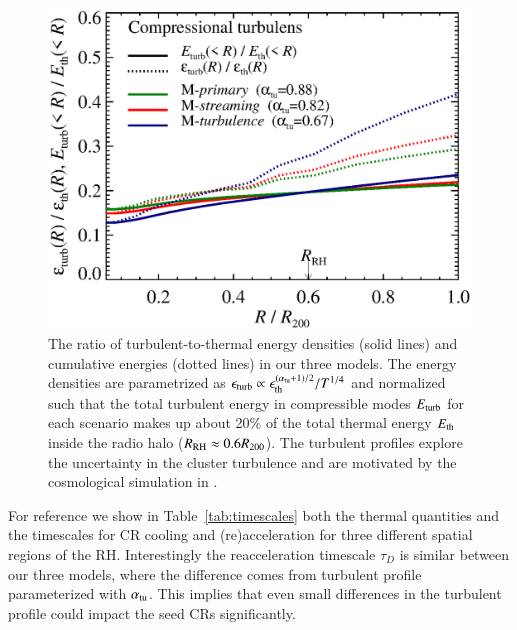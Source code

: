 \documentclass[a4paper,fleqn,usenatbib]{mnras}
\begin{document}
\begin{figure}
  \includegraphics[width=1.0\columnwidth]{turb_profile_ratio_tot.eps}
  \caption{The ratio of turbulent-to-thermal energy densities (solid
    lines) and cumulative energies (dotted lines) in our three
    models. The energy densities are parametrized as
    $\epsilon_{\mathrm{turb}} \propto
    \epsilon_{\mathrm{th}}^{(\alpha_{{\mathrm{tu}}}+1)/2}/T^{1/4}$ and
    normalized such that the total turbulent energy in compressible
    modes $E_{\mathrm{turb}}$ for each scenario makes up about 20\% of the
    total thermal energy $E_{\mathrm{th}}$ inside the radio halo
    ($R_{\mathrm{RH}}\approx0.6R_{200}$). The turbulent profiles explore
    the uncertainty in the cluster turbulence and are motivated by the
    cosmological simulation in
    \citep{2009ApJ...705.1129L,2010ApJ...725.1452S,2011A&A...529A..17V}.}
  \label{fig:turb}
\end{figure}

For reference we show in Table~\ref{tab:timescales} both the thermal
quantities and the timescales for CR cooling and (re)acceleration for
three different spatial regions of the RH. Interestingly the
reacceleration timescale $\tau_D$ is similar between our three models,
where the difference comes from turbulent profile parameterized with
$\alpha_{\mathrm{tu}}$. This implies that even small differences in the
turbulent profile could impact the seed CRs significantly.
\end{document}
